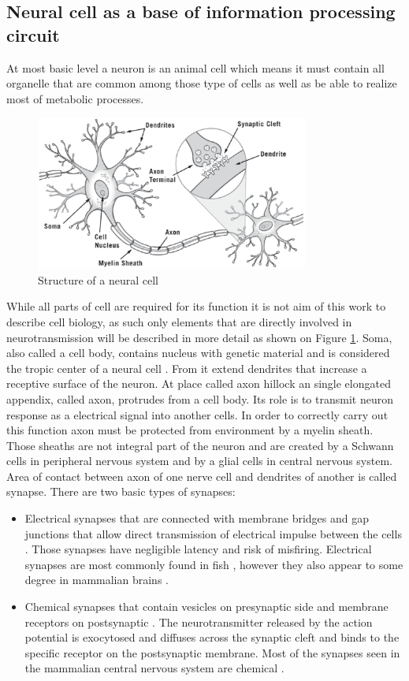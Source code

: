 \subsection{Neural cell as a base of information processing circuit}
At most basic level a neuron is an animal cell which means it must contain all organelle that
are common among those type of cells as well as be able to realize most of metabolic processes.
\begin{figure}[htb] 
	\centering
	\includegraphics[width=0.8\textwidth]{figures/neural_cell}
	\caption{Structure of a neural cell \cite{Cook2014}}
	\label{fig:neural_cell}
\end{figure}
While all parts of cell are required for its function it is not aim of this work to describe 
cell biology, as such only elements that are directly involved in neurotransmission will be
described in more detail as shown on Figure \ref{fig:neural_cell}.
Soma, also called a cell body, contains nucleus with genetic material and is considered the 
tropic center of a neural cell \cite{Jacobson2017}. From it extend dendrites that increase a 
receptive surface of  the neuron.
At place called axon hillock an single elongated appendix, called axon, protrudes
from a cell body. Its role is to transmit neuron response as a electrical signal into another
cells. In order to correctly carry out this function axon must be protected from environment 
by a myelin sheath. Those sheaths are not integral part of the neuron and are created by a
Schwann cells in peripheral nervous system and by a glial cells in central nervous system.
Area of contact between axon of one nerve cell and dendrites of another is called synapse.
There are two basic types of synapses:
\begin{itemize}
	\item Electrical synapses that are connected with membrane bridges and gap junctions
	that allow direct transmission of electrical impulse between the cells \cite{Connors2017}.
	Those synapses have negligible latency and risk of misfiring.
	Electrical synapses are most commonly found in fish \cite{Yao2014}, however they also appear
	to some degree in mammalian brains \cite{Connors2004}.
	\item Chemical synapses that contain vesicles on presynaptic side and membrane receptors on 
	postsynaptic \cite{Fuster2015}.
	The neurotransmitter released by the action potential is exocytosed and diffuses
	across the synaptic cleft and binds to the specific receptor on the postsynaptic membrane.
	Most of the synapses seen in the mammalian central nervous system are chemical \cite{Boto2019}.
\end{itemize}
